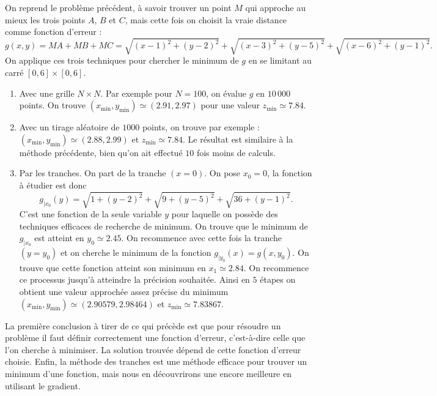 \documentclass[11pt,class=report,crop=false]{standalone}
\begin{document}
\begin{exemple}
On reprend le problème précédent, à savoir trouver un point $M$ qui approche au mieux les trois points $A$, $B$ et $C$, mais cette fois on choisit la \og{}vraie\fg{} distance comme fonction d'erreur :
$$g(x,y) = MA+MB+MC = 
\sqrt{(x-1)^2+ (y-2)^2} + \sqrt{(x-3)^2 + (y-5)^2} + \sqrt{(x-6)^2 + (y-1)^2}.$$
On applique ces trois techniques pour chercher le minimum de $g$ en se limitant au carré $[0,6]\times[0,6]$.

\begin{enumerate}

  \item Avec une grille $N\times N$. Par exemple pour $N=100$, on évalue $g$ en $10\,000$ points. On trouve $(x_{\min},y_{\min}) \simeq (2.91,2.97)$ pour une valeur $z_{\min} \simeq 7.84$. 
  
  \item Avec un tirage aléatoire de $1000$ points, on trouve par exemple :
  $(x_{\min},y_{\min}) \simeq (2.88,2.99)$ et $z_{\min} \simeq 7.84$. Le résultat est similaire à la méthode précédente, bien qu'on ait effectué $10$ fois moins de calculs.
  
  \item Par les tranches. On part de la tranche $(x=0)$. On pose $x_0=0$, la fonction à étudier
  est donc 
  $$g_{|x_0}(y) = \sqrt{1 + (y-2)^2} + \sqrt{9 + (y-5)^2} + \sqrt{36 + (y-1)^2}.$$
  C'est une fonction de la seule variable $y$ pour laquelle on possède des techniques efficaces de recherche de minimum.
  On trouve que le minimum de $g_{|x_0}$ est atteint en $y_0 \simeq 2.45$.
  On recommence avec cette fois la tranche $(y = y_0)$ et on cherche le minimum de la fonction $g_{|y_0}(x) = g(x,y_0)$. On trouve que cette fonction atteint son minimum en $x_1 \simeq 2.84$. 
  On recommence ce processus jusqu'à atteindre la précision souhaitée.
  Ainsi en $5$ étapes on obtient une valeur approchée assez précise du minimum 
  $(x_{\min},y_{\min}) \simeq (2.90579,2.98464)$ et $z_{\min} \simeq 7.83867$.
  
  
\end{enumerate}
\end{exemple}

La première conclusion à tirer de ce qui précède est que pour résoudre un problème il faut définir correctement une fonction d'erreur, c'est-à-dire celle que l'on cherche à minimiser. La solution trouvée dépend de cette fonction d'erreur choisie. 
Enfin, la méthode des tranches est une méthode efficace pour trouver un minimum d'une fonction, mais nous en découvrirons une encore meilleure en utilisant le gradient.
\end{document}
